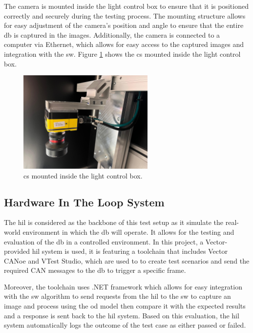 The camera is mounted inside the light control box to ensure that it is positioned correctly and securely during the testing process. The mounting structure allows for easy adjustment of the camera's position and angle to ensure that the entire \gls{db} is captured in the images. Additionally, the camera is connected to a computer via Ethernet, which allows for easy access to the captured images and integration with the \gls{sw}. Figure \ref{Camera_Mounting} shows the \gls{cs} mounted inside the light control box.

\begin{figure}[!htb]
    \centering
    \includegraphics[width=0.6\textwidth]{Figures/Camera_Mounting.jpg}
    \caption{\gls{cs} mounted inside the light control box.}
    \label{Camera_Mounting}
\end{figure}

\subsection{Hardware In The Loop System}
The \gls{hil} is considered as the backbone of this test setup as it simulate the real-world environment in which the \gls{db} will operate. It allows for the testing and evaluation of the \gls{db} in a controlled environment. In this project, a Vector-provided \gls{hil} system is used, it is featuring a toolchain that includes Vector CANoe and VTest Studio, which are used to to create test scenarios and send the required CAN messages to the \gls{db} to trigger a specific frame.

Moreover, the toolchain uses .NET framework which allows for easy integration with the \gls{sw} algorithm to send requests from the \gls{hil} to the \gls{sw} to capture an image and process using the \gls{od} model then compare it with the expected results and a response is sent back to the \gls{hil} system. Based on this evaluation, the \gls{hil} system automatically logs the outcome of the test case as either passed or failed.

